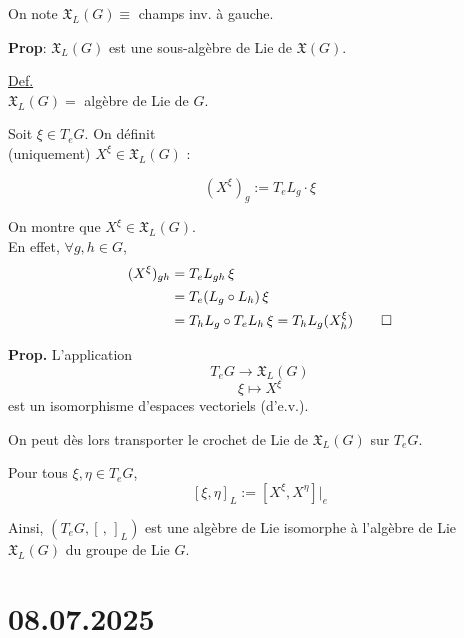 \documentclass[11pt,a4paper]{article}
\begin{document}
	On note $\mathfrak{X}_L(G) \equiv$ champs inv. à gauche.
	
	\vspace{1em}
	
	\noindent
	\textbf{Prop}: $\mathfrak{X}_L(G)$ est une sous-algèbre de Lie de $\mathfrak{X}(G)$.
	
	\underline{Def.} \\
	$\mathfrak{X}_L(G) =$ algèbre de Lie de $G$.
	
	\vspace{1em}
	
	Soit $\xi \in T_e G$. On définit \\
	(uniquement) $X^\xi \in \mathfrak{X}_L(G)$ :
	
	\[
	(X^\xi)_g := T_e L_g \cdot \xi
	\]
	
	
	On montre que $X^\xi \in \mathfrak{X}_L(G)$. \\
	En effet, $\forall g, h \in G$,
\begin{align*}
	(X^\xi)_{gh} &= T_e L_{gh} \, \xi \\
	\phantom{(X^\xi)_{gh}} &= T_e(L_g \circ L_h) \, \xi \\
	\phantom{(X^\xi)_{gh}} &  = T_h L_g \circ T_e L_h \, \xi = T_h L_g (X^\xi_h) \qed \\
\end{align*}

\textbf{Prop.} L'application
\[
T_e G \longrightarrow \mathfrak{X}_L(G)
\]
\[
\xi \longmapsto X^\xi
\]
est un isomorphisme d'espaces vectoriels (d'e.v.).

\vspace{1em}

On peut dès lors transporter le crochet de Lie de $\mathfrak{X}_L(G)$ sur $T_e G$.

Pour tous $\xi, \eta \in T_e G$,
\[
[\xi, \eta]_L := [X^\xi, X^\eta] \big|_e
\]

Ainsi, $(T_e G, [\, , \, ]_L)$ est une algèbre de Lie isomorphe à l'algèbre de Lie $\mathfrak{X}_L(G)$ du groupe de Lie $G$.

\section{08.07.2025}
\end{document}
